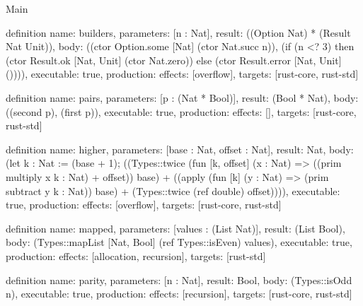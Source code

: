 \begin{lexlean}{Main}
\begin{semanticmodule}
definition{
  name: builders,
  parameters: [n : Nat],
  result: ((Option Nat) * (Result Nat Unit)),
  body: ((ctor Option.some [Nat] (ctor Nat.succ n)), (if (n <? 3) then (ctor Result.ok [Nat, Unit] (ctor Nat.zero)) else (ctor Result.error [Nat, Unit] ()))),
  executable: true,
  production: {effects: [overflow], targets: [rust-core, rust-std]}
}

definition{
  name: pairs,
  parameters: [p : (Nat * Bool)],
  result: (Bool * Nat),
  body: ((second p), (first p)),
  executable: true,
  production: {effects: [], targets: [rust-core, rust-std]}
}

definition{
  name: higher,
  parameters: [base : Nat, offset : Nat],
  result: Nat,
  body: (let k : Nat := (base + 1); ((Types::twice (fun [k, offset] (x : Nat) => ((prim multiply x k : Nat) + offset)) base) + ((apply (fun [k] (y : Nat) => (prim subtract y k : Nat)) base) + (Types::twice (ref double) offset)))),
  executable: true,
  production: {effects: [overflow], targets: [rust-core, rust-std]}
}

definition{
  name: mapped,
  parameters: [values : (List Nat)],
  result: (List Bool),
  body: (Types::mapList [Nat, Bool] (ref Types::isEven) values),
  executable: true,
  production: {effects: [allocation, recursion], targets: [rust-std]}
}

definition{
  name: parity,
  parameters: [n : Nat],
  result: Bool,
  body: (Types::isOdd n),
  executable: true,
  production: {effects: [recursion], targets: [rust-core, rust-std]}
}
\end{semanticmodule}
\end{lexlean}
